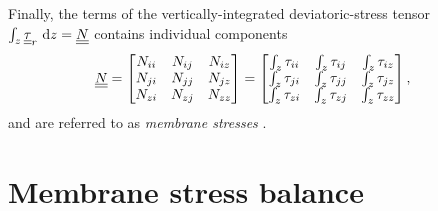 Finally, the terms of the vertically-integrated deviatoric-stress tensor $\int_z \underline{\underline{\tau}}_r \ \mathrm{d}z = \underline{\underline{N}}$ contains individual components 
\begin{align}
  \label{membrane_stress_tensor}
  \underline{\underline{N}} &= \begin{bmatrix}
                   N_{ii} & N_{ij} & N_{iz} \\
                   N_{ji} & N_{jj} & N_{jz} \\
                   N_{zi} & N_{zj} & N_{zz}
                 \end{bmatrix}
               = \begin{bmatrix}
                   \int_z \tau_{ii} & \int_z \tau_{ij} & \int_z \tau_{iz}  \\ 
                   \int_z \tau_{ji} & \int_z \tau_{jj} & \int_z \tau_{jz}  \\ 
                   \int_z \tau_{zi} & \int_z \tau_{zj} & \int_z \tau_{zz}
                 \end{bmatrix},
\end{align}
and are referred to as \emph{membrane stresses} \citep{greve_2009}.  

\section{Membrane stress balance} \label{ssn_membrane_stress_balance}

